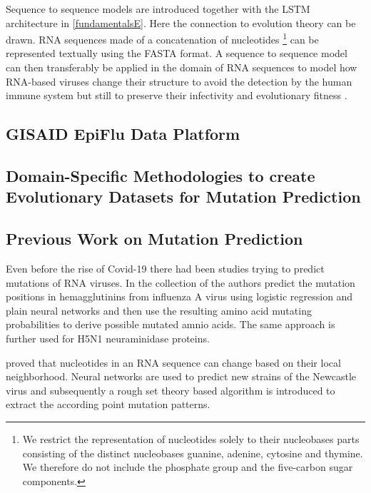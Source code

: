 Sequence to sequence models are introduced together with the \ac{LSTM} architecture in \autoref{fundamentalsE}. Here the connection to evolution theory can be drawn. \ac{RNA} sequences made of a concatenation of nucleotides \footnote{We restrict the representation of nucleotides solely to their nucleobases parts consisting of the distinct nucleobases guanine, adenine, cytosine and thymine. We therefore do not include the phosphate group and the five-carbon sugar components.} can be represented textually using the FASTA format. A sequence to sequence model can then transferably be applied in the domain of \ac{RNA} sequences to model how \ac{RNA}-based viruses change their structure to avoid the detection by the human immune system but still to preserve their infectivity and evolutionary fitness \cite{Hie2021}. 

\subsection{GISAID EpiFlu Data Platform} \label{fundamentalsB}

\subsection{Domain-Specific Methodologies to create Evolutionary  Datasets for Mutation Prediction} \label{fundamentalsC}

\subsection{Previous Work on Mutation Prediction} \label{fundamentalsD}

Even before the rise of Covid-19 there had been studies trying to predict mutations of \ac{RNA} viruses. In the collection of \cite{Wu2007, Yan2007, Wu2008} the authors predict the mutation positions in hemagglutinins from influenza A virus using logistic regression and plain neural networks and then use the resulting amino acid mutating probabilities to derive possible mutated amnio acids. The same approach is further used for H5N1 neuraminidase proteins. 

\cite{Salama2016} proved that nucleotides in an \ac{RNA} sequence can change based on their local neighborhood. Neural networks are used to predict new strains of the Newcastle virus and subsequently a rough set theory based algorithm is introduced to extract the according point mutation patterns. 

